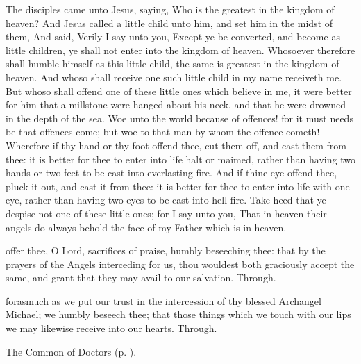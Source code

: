  The disciples came unto Jesus, saying, Who is the greatest in the kingdom of heaven? And Jesus called a little child unto him, and set him in the midst of them, And said, Verily I say unto you, Except ye be converted, and become as little children, ye shall not enter into the kingdom of heaven. Whosoever therefore shall humble himself as this little child, the same is greatest in the kingdom of heaven. And whoso shall receive one such little child in my name receiveth me. But whoso shall offend one of these little ones which believe in me, it were better for him that a millstone were hanged about his neck, and that he were drowned in the depth of the sea. Woe unto the world because of offences! for it must needs be that offences come; but woe to that man by whom the offence cometh! Wherefore if thy hand or thy foot offend thee, cut them off, and cast them from thee: it is better for thee to enter into life halt or maimed, rather than having two hands or two feet to be cast into everlasting fire. And if thine eye offend thee, pluck it out, and cast it from thee: it is better for thee to enter into life with one eye, rather than having two eyes to be cast into hell fire. Take heed that ye despise not one of these little ones; for I say unto you, That in heaven their angels do always behold the face of my Father which is in heaven.


\secret
{} offer thee, O Lord, sacrifices of praise, humbly beseeching thee: that by the prayers of the Angels interceding for us, thou wouldest both graciously accept the same, and grant that they may avail to our salvation. Through.


\postcommunion
{} forasmuch as we put our trust in the intercession of thy blessed Archangel Michael; we humbly beseech thee; that those things which we touch with our lips we may likewise receive into our hearts. Through.


\clearpage
{}

\begin{rubric}
	The Common of Doctors (p. \pageref{CommonDoctors}).
\end{rubric}

